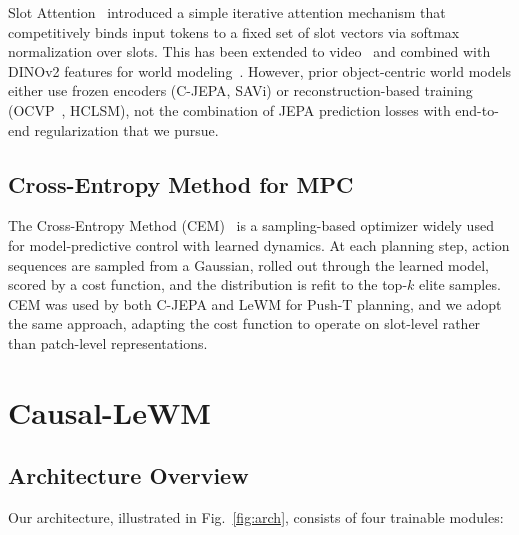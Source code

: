 \documentclass[12pt]{article}
\begin{document}
Slot Attention~\citep{locatello2020slot} introduced a simple iterative attention mechanism that competitively binds input tokens to a fixed set of slot vectors via softmax normalization over slots. This has been extended to video~\citep{kipf2021savi,wu2023videosaur} and combined with DINOv2 features for world modeling~\citep{nam2026cjepa}. However, prior object-centric world models either use frozen encoders (C-JEPA, SAVi) or reconstruction-based training (OCVP~\citep{villarcorrales2022ocvp}, HCLSM), not the combination of JEPA prediction losses with end-to-end regularization that we pursue.

\subsection{Cross-Entropy Method for MPC}

The Cross-Entropy Method (CEM)~\citep{rubinstein2004cem} is a sampling-based optimizer widely used for model-predictive control with learned dynamics. At each planning step, action sequences are sampled from a Gaussian, rolled out through the learned model, scored by a cost function, and the distribution is refit to the top-$k$ elite samples. CEM was used by both C-JEPA and LeWM for Push-T planning, and we adopt the same approach, adapting the cost function to operate on slot-level rather than patch-level representations.

\section{Causal-LeWM}

\subsection{Architecture Overview}

Our architecture, illustrated in Fig.~\ref{fig:arch}, consists of four trainable modules:
\end{document}
